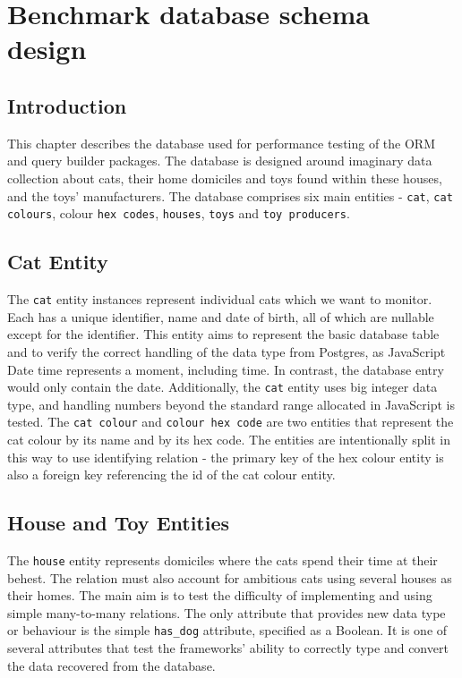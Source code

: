 \chapter{Benchmark database schema design}\label{ch:database}

\section{Introduction}
This chapter describes the database used for performance testing of the ORM and
query builder packages. The database is designed around imaginary data
collection about cats, their home domiciles and toys found within these houses,
and the toys' manufacturers. The database comprises six main entities -
\texttt{cat}, \texttt{cat colours}, colour \texttt{hex codes}, \texttt{houses},
\texttt{toys} and \texttt{toy producers}.

\section{Cat Entity}
The \texttt{cat} entity instances represent individual cats which we want to
monitor. Each has a unique identifier, name and date of birth, all of which are
nullable except for the identifier. This entity aims to represent the basic
database table and to verify the correct handling of the data type from
Postgres, as JavaScript Date time represents a moment, including time. In
contrast, the database entry would only contain the date. Additionally, the
\texttt{cat} entity uses big integer data type, and handling numbers beyond the
standard range allocated in JavaScript is tested. The \texttt{cat colour} and
\texttt{colour hex code} are two entities that represent the cat colour by its
name and by its hex code. The entities are intentionally split in this way to
use identifying relation - the primary key of the hex colour entity is also a
foreign key referencing the id of the cat colour entity.

\section{House and Toy Entities}
The \texttt{house} entity represents domiciles where the cats spend their time
at their behest. The relation must also account for ambitious cats using several
houses as their homes. The main aim is to test the difficulty of implementing
and using simple many-to-many relations. The only attribute that provides new
data type or behaviour is the simple \verb|has_dog| attribute, specified as a
Boolean. It is one of several attributes that test the frameworks' ability to
correctly type and convert the data recovered from the database.

